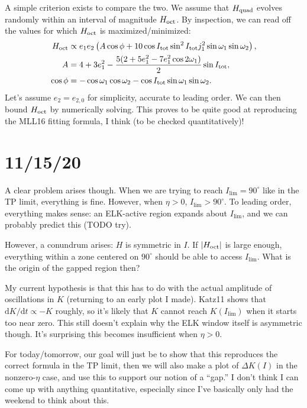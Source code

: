 \documentclass[11pt,
        usenames, %
        dvipsnames %
    ]{article}
\newcommand*{\rdil}[2]{\mathrm{d}#1 / \mathrm{d}#2}
\newcommand*{\abs}[1]{\left|#1\right|}
\newcommand*{\p}[1]{\left(#1\right)}
\begin{document}
A simple criterion exists to compare the two. We assume that $H_{\rm quad}$
evolves randomly within an interval of magnitude $H_{\rm oct}$. By inspection,
we can read off the values for which $H_{\rm oct}$ is maximized/minimized:
\begin{align}
    H_{\rm oct} &\propto e_1 e_2 \p{
        A \cos \phi + 10 \cos I_{\rm tot} \sin^2 I_{\rm tot} j_1^2
        \sin \omega_1 \sin \omega_2},\\
    A &= 4 + 3e_1^{2} - \frac{5(2 + 5e_1^2 - 7e_1^2 \cos 2\omega_1)}{2}
        \sin I_{\rm tot},\\
    \cos \phi &= -\cos \omega_1 \cos \omega_2 - \cos I_{\rm tot} \sin \omega_1
        \sin \omega_2.
\end{align}
Let's assume $e_2 = e_{2, 0}$ for simplicity, accurate to leading order. We can
then bound $H_{\rm oct}$ by numerically solving. This proves to be quite
good at reproducing the MLL16 fitting formula, I think (to be checked
quantitatively)!

\section{11/15/20}

A clear problem arises though. When we are trying to reach $I_{\lim} = 90^\circ$
like in the TP limit, everything is fine. However, when $\eta > 0$, $I_{\lim} >
90^\circ$. To leading order, everything makes sense: an ELK-active region
expands about $I_{\lim}$, and we can probably predict this (TODO try).

However, a conundrum arises: $H$ is symmetric in $I$. If $\abs{H_{\rm oct}}$ is
large enough, everything within a zone centered on $90^\circ$ should be able to
access $I_{\lim}$. What is the origin of the gapped region then?

My current hypothesis is that this has to do with the actual amplitude of
oscillations in $K$ (returning to an early plot I made). Katz11 shows that
$\rdil{K}{t} \propto -K$ roughly, so it's likely that $K$ cannot reach
$K(I_{\lim})$ when it starts too near zero. This still doesn't explain why the
ELK window itself is asymmetric though. It's surprising this becomes
insufficient when $\eta > 0$.

For today/tomorrow, our goal will just be to show that this reproduces the
correct formula in the TP limit, then we will also make a plot of $\Delta K(I)$
in the nonzero-$\eta$ case, and use this to support our notion of a ``gap.'' I
don't think I can come up with anything quantitative, especially since I've
basically only had the weekend to think about this.
\end{document}
